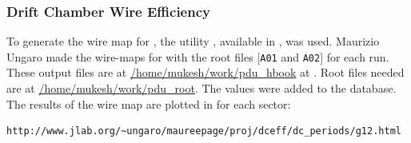 \subsubsection{\label{sec:calib.dc.eff}Drift Chamber Wire Efficiency}

To generate the wire map for , the utility , available in , was used. Maurizio Ungaro made the wire-maps for  with the root files [\verb+A01+ and \verb+A02+] for each run. These output files are at \url{/home/mukesh/work/pdu_hbook} at . Root files needed are at \url{/home/mukesh/work/pdu_root}. The values were added to the  database. The results of the wire map are plotted in for each sector:

\begin{verbatim}
http://www.jlab.org/~ungaro/maureepage/proj/dceff/dc_periods/g12.html
\end{verbatim}

\FloatBarrier
